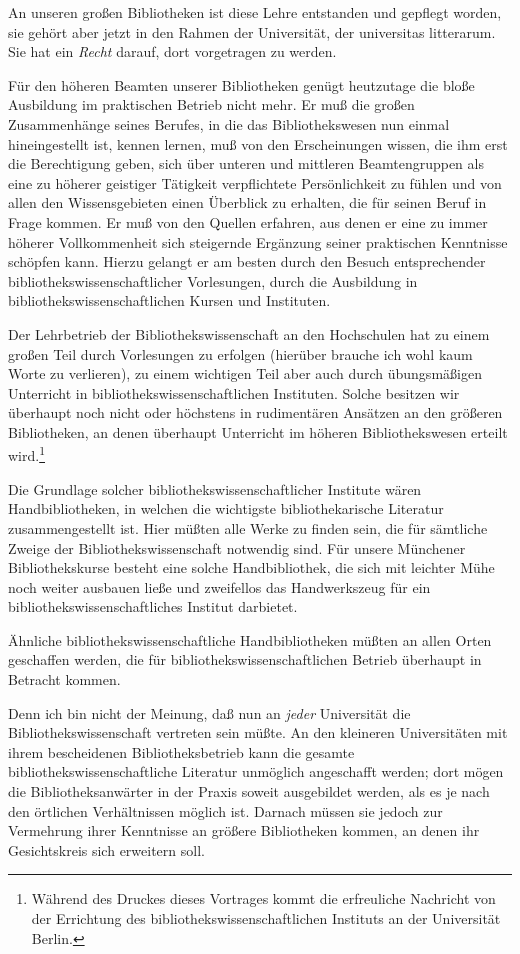 \documentclass[a4paper,
fontsize=11pt,
oneside,
numbers=noperiodatend,
parskip=half-,
bibliography=totoc,
final
]{scrartcl}
\begin{document}
An unseren großen Bibliotheken ist diese Lehre entstanden und gepflegt
worden, sie gehört aber jetzt in den Rahmen der Universität, der
universitas litterarum. Sie hat ein \emph{Recht} darauf, dort
vorgetragen zu werden.

Für den höheren Beamten unserer Bibliotheken genügt heutzutage die bloße
Ausbildung im praktischen Betrieb nicht mehr. Er muß die großen
Zusammenhänge seines Berufes, in die das Bibliothekswesen nun einmal
hineingestellt ist, kennen lernen, muß von den Erscheinungen wissen, die
ihm erst die Berechtigung geben, sich über unteren und mittleren
Beamtengruppen als eine zu höherer geistiger Tätigkeit verpflichtete
Persönlichkeit zu fühlen und von allen den Wissensgebieten einen
Überblick zu erhalten, die für seinen Beruf in Frage kommen. Er muß von
den Quellen erfahren, aus denen er eine zu immer höherer Vollkommenheit
sich steigernde Ergänzung seiner praktischen Kenntnisse schöpfen kann.
Hierzu gelangt er am besten durch den Besuch entsprechender
bibliothekswissenschaftlicher Vorlesungen, durch die Ausbildung in
bibliothekswissenschaftlichen Kursen und Instituten.

Der Lehrbetrieb der Bibliothekswissenschaft an den Hochschulen hat zu
einem großen Teil durch Vorlesungen zu erfolgen (hierüber brauche ich
wohl kaum Worte zu verlieren), zu einem wichtigen Teil aber auch durch
übungsmäßigen Unterricht in bibliothekswissenschaftlichen Instituten.
Solche besitzen wir überhaupt noch nicht oder höchstens in rudimentären
Ansätzen an den größeren Bibliotheken, an denen überhaupt Unterricht im
höheren Bibliothekswesen erteilt wird.\footnote{Während des Druckes
  dieses Vortrages kommt die erfreuliche Nachricht von der Errichtung
  des bibliothekswissenschaftlichen Instituts an der Universität Berlin.}

Die Grundlage solcher bibliothekswissenschaftlicher Institute wären
Handbibliotheken, in welchen die wichtigste bibliothekarische Literatur
zusammengestellt ist. Hier müßten alle Werke zu finden sein, die für
sämtliche Zweige der Bibliothekswissenschaft notwendig sind. Für unsere
Münchener Bibliothekskurse besteht eine solche Handbibliothek, die sich
mit leichter Mühe noch weiter ausbauen ließe und zweifellos das
Handwerkszeug für ein bibliothekswissenschaftliches Institut darbietet.

Ähnliche bibliothekswissenschaftliche Handbibliotheken müßten an allen
Orten geschaffen werden, die für bibliothekswissenschaftlichen Betrieb
überhaupt in Betracht kommen.

Denn ich bin nicht der Meinung, daß nun an \emph{jeder} Universität die
Bibliothekswissenschaft vertreten sein müßte. An den kleineren
Universitäten mit ihrem bescheidenen Bibliotheksbetrieb kann die gesamte
bibliothekswissenschaftliche Literatur unmöglich angeschafft werden;
dort mögen die Bibliotheksanwärter in der Praxis soweit ausgebildet
werden, als es je nach den örtlichen Verhältnissen möglich ist. Darnach
müssen sie jedoch zur Vermehrung ihrer Kenntnisse an größere
Bibliotheken kommen, an denen ihr Gesichtskreis sich erweitern soll.
\end{document}
